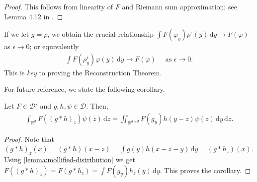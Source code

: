 \begin{proof}
    This follows from linearity of $F$ and Riemann sum approximation; see Lemma 4.12 in \cite{JanKristensenDistribution}.
\end{proof}

If we let $g = \rho$, we obtain the crucial relationship $\int F(\varphi_y)\rho^{\epsilon}(y) \, \mathrm{d}y \to F(\varphi)$ as $\epsilon \to 0$; or equivalently
\begin{align}\label{eq:starting-point}
    \int F(\rho_y^\epsilon) \varphi(y)\, \mathrm{d}y \to F(\varphi) \quad \text{ as } \epsilon \to 0.
\end{align}
This is \emph{key} to proving the Reconstruction Theorem. 

For future reference, we state the following corollary.
\begin{corollary}\label{cor:minosokoad}
    Let $F \in \mathcal{D}'$ and $g,h, \psi \in \mathcal{D}$. Then, 
    \begin{align*}
        \int_{\mathbb{R}^d} F((g*h)_z) \psi(z)\, \mathrm{d}z
    = \iint_{\mathbb{R}^{d \times d}} F(g_y)  h(y-z) \psi(z) \, \mathrm{d}y\, \mathrm{d}z.
    \end{align*}
\end{corollary}

\begin{proof}
    Note that $(g*h)_z(x) = (g*h)(x - z) = \int g(y)h(x-z-y) \, \mathrm{d}y = (g*h_z)(x)$. Using \eqref{lemma:mollified-distribution} we get $F((g*h)_z) = F(g*h_z) = \int F(g_y) h_z(y) \, \mathrm{d}y$. This proves the corollary.
\end{proof}
